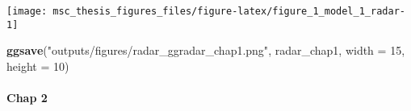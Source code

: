 \documentclass[
]{article}
\newenvironment{Shaded}{\begin{snugshade}}{\end{snugshade}}
\newcommand{\DataTypeTok}[1]{\textcolor[rgb]{0.13,0.29,0.53}{#1}}
\newcommand{\DecValTok}[1]{\textcolor[rgb]{0.00,0.00,0.81}{#1}}
\newcommand{\KeywordTok}[1]{\textcolor[rgb]{0.13,0.29,0.53}{\textbf{#1}}}
\newcommand{\NormalTok}[1]{#1}
\newcommand{\StringTok}[1]{\textcolor[rgb]{0.31,0.60,0.02}{#1}}
\begin{document}
\texttt{[image: msc\_thesis\_figures\_files/figure-latex/figure\_1\_model\_1\_radar-1]}

\begin{Shaded}
\begin{Highlighting}[]
\KeywordTok{ggsave}\NormalTok{(}\StringTok{"outputs/figures/radar_ggradar_chap1.png"}\NormalTok{, radar_chap1, }\DataTypeTok{width =} \DecValTok{15}\NormalTok{, }\DataTypeTok{height =} \DecValTok{10}\NormalTok{)}
\end{Highlighting}
\end{Shaded}

\hypertarget{chap-2}{%
\paragraph{Chap 2}\label{chap-2}}
\end{document}
